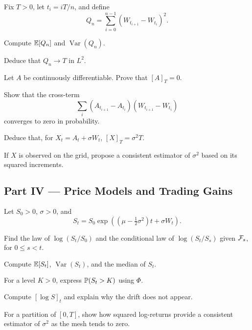 \begin{exercise}
Fix \(T>0\), let \(t_i=iT/n\), and define
\[
Q_n=\sum_{i=0}^{n-1}(W_{t_{i+1}}-W_{t_i})^2.
\]
\begin{exparts}
  \item Compute \(\mathbb{E}[Q_n]\) and \(\operatorname{Var}(Q_n)\).
  \item Deduce that \(Q_n\to T\) in \(L^2\).
  \item Let \(A\) be continuously differentiable. Prove that \([A]_T=0\).
  \item Show that the cross-term
  \[
  \sum_i(A_{t_{i+1}}-A_{t_i})(W_{t_{i+1}}-W_{t_i})
  \]
  converges to zero in probability.
  \item Deduce that, for \(X_t=A_t+\sigma W_t\),
  \([X]_T=\sigma^2T\).
  \item If \(X\) is observed on the grid, propose a consistent estimator of
  \(\sigma^2\) based on its squared increments.
\end{exparts}
\end{exercise}

\subsection*{Part IV --- Price Models and Trading Gains}

\begin{exercise}
Let \(S_0>0\), \(\sigma>0\), and
\[
S_t=S_0\exp\!\left(
\left(\mu-\tfrac12\sigma^2\right)t+\sigma W_t
\right).
\]
\begin{exparts}
  \item Find the law of \(\log(S_t/S_0)\) and the conditional law of
  \(\log(S_t/S_s)\) given \(\mathcal{F}_s\), for \(0\leq s<t\).
  \item Compute \(\mathbb{E}[S_t]\), \(\operatorname{Var}(S_t)\), and the median of
  \(S_t\).
  \item For a level \(K>0\), express \(\mathbb{P}(S_t>K)\) using \(\Phi\).
  \item Compute \([\log S]_t\) and explain why the drift does not appear.
  \item For a partition of \([0,T]\), show how squared log-returns provide
  a consistent estimator of \(\sigma^2\) as the mesh tends to zero.
\end{exparts}
\end{exercise}

